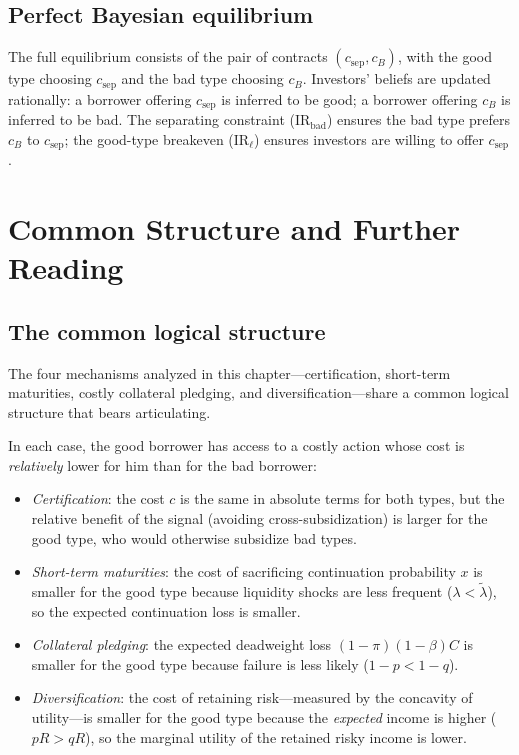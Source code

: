 \documentclass[11pt,a4paper,oneside]{book}
\theoremstyle{plain}
\theoremstyle{definition}
\theoremstyle{remark}
\numberwithin{equation}{chapter}
\begin{document}
\subsection{Perfect Bayesian equilibrium}

The full equilibrium consists of the pair of contracts $(c_{\text{sep}}, c_B)$, with the good type choosing $c_{\text{sep}}$ and the bad type choosing $c_B$.
Investors' beliefs are updated rationally: a borrower offering $c_{\text{sep}}$ is inferred to be good; a borrower offering $c_B$ is inferred to be bad.
The separating constraint (IR$_{\text{bad}}$) ensures the bad type prefers $c_B$ to $c_{\text{sep}}$; the good-type breakeven (IR$_\ell$) ensures investors are willing to offer $c_{\text{sep}}$.

\section{Common Structure and Further Reading}
\label{sec:diss-further}

\subsection{The common logical structure}

The four mechanisms analyzed in this chapter---certification, short-term maturities, costly collateral pledging, and diversification---share a common logical structure that bears articulating.

In each case, the good borrower has access to a costly action whose cost is \emph{relatively} lower for him than for the bad borrower:

\begin{itemize}
  \item \emph{Certification}: the cost $c$ is the same in absolute terms for both types, but the relative benefit of the signal (avoiding cross-subsidization) is larger for the good type, who would otherwise subsidize bad types.
  \item \emph{Short-term maturities}: the cost of sacrificing continuation probability $x$ is smaller for the good type because liquidity shocks are less frequent ($\lambda < \widetilde{\lambda}$), so the expected continuation loss is smaller.
  \item \emph{Collateral pledging}: the expected deadweight loss $(1 - \pi)(1 - \beta) C$ is smaller for the good type because failure is less likely ($1 - p < 1 - q$).
  \item \emph{Diversification}: the cost of retaining risk---measured by the concavity of utility---is smaller for the good type because the \emph{expected} income is higher ($pR > qR$), so the marginal utility of the retained risky income is lower.
\end{itemize}
\end{document}
